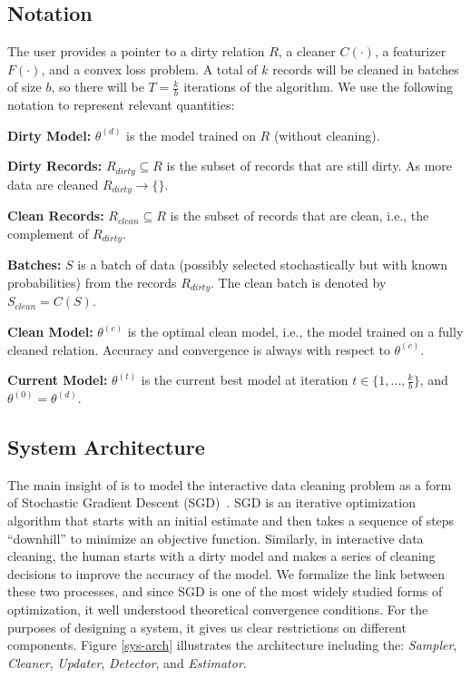 \subsection{Notation}\label{notation}
The user provides a pointer to a dirty relation $R$, a cleaner $C(\cdot)$, a featurizer $F(\cdot)$, and a convex loss problem.
A total of $k$ records will be cleaned in batches of size $b$, so there will be $T = \frac{k}{b}$ iterations of the algorithm.  
We use the following notation to represent relevant quantities:

\vspace{0.25em}

\noindent\textbf{Dirty Model: } $\theta^{(d)}$ is the model trained on $R$ (without cleaning). 

\vspace{0.25em}

\noindent\textbf{Dirty Records: } $R_{dirty} \subseteq R$ is the subset of records that are still dirty. As more data are cleaned $R_{dirty} \rightarrow \{\}$.

\vspace{0.25em}

\noindent\textbf{Clean Records: } $R_{clean} \subseteq R$ is the subset of records that are clean, i.e., the complement of $R_{dirty}$.

\vspace{0.25em}

\noindent\textbf{Batches: } $S$ is a batch of data (possibly selected stochastically but with known probabilities) from the records $R_{dirty}$. The clean batch is denoted by $S_{clean} = C(S)$.

\vspace{0.25em}

\noindent\textbf{Clean Model: } $\theta^{(c)}$ is the optimal clean model, i.e., the model trained on a fully cleaned relation. Accuracy and convergence is always with respect to $\theta^{(c)}$.

\noindent\textbf{Current Model: } $\theta^{(t)}$ is the current best model at iteration $t \in \{1,...,\frac{k}{b}\}$, and $\theta^{(0)} = \theta^{(d)}$. 


\subsection{System Architecture}\label{syarch}
The main insight of \sys is to model the interactive data cleaning problem as a form of Stochastic Gradient Descent (SGD)~\cite{bottou2012stochastic}.
SGD is an iterative optimization algorithm that starts with an initial estimate and then takes a sequence of steps ``downhill'' to minimize an objective function.
Similarly, in interactive data cleaning, the human starts with a dirty model and makes a series of cleaning decisions to improve the accuracy of the model.
We formalize the link between these two processes, and since SGD is one of the most widely studied forms of optimization, it well understood theoretical convergence conditions.
For the purposes of designing a system, it gives us clear restrictions on different components.
Figure \ref{sys-arch} illustrates the \sys architecture including the: {\it Sampler}, {\it Cleaner}, \emph{Updater}, {\it Detector}, and {\it Estimator}.

